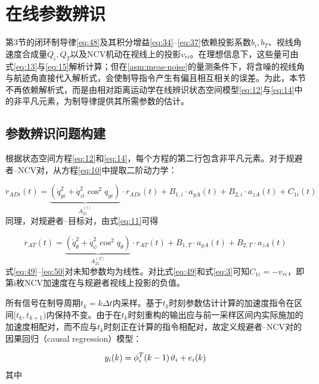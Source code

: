 \section{在线参数辨识}
第3节的闭环制导律\eqref{eq:48}及其积分增益\eqref{eq:34}--\eqref{eq:37}依赖投影系数${b_i},{b_T}$、视线角速度合成量${\dot Q_i},{\dot Q_T}$以及NCV机动在视线上的投影${v_{ri}}$。在理想信息下，这些量可由式\eqref{eq:13}与\eqref{eq:15}解析计算；但在\cref{asm:meas-noise}的量测条件下，将含噪的视线角与航迹角直接代入解析式，会使制导指令产生有偏且相互相关的误差。为此，本节不再依赖解析式，而是由相对距离运动学在线辨识状态空间模型\eqref{eq:12}与\eqref{eq:14}中的非平凡元素，为制导律提供其所需参数的估计。

\subsection{参数辨识问题构建}
根据状态空间方程\eqref{eq:12}和\eqref{eq:14}，每个方程的第二行包含非平凡元素。对于规避者–NCV对，从方程\eqref{eq:10}中提取二阶动力学：

\begin{equation}
\label{eq:49}
{\ddot r_{ADi}}(t) = \underbrace {(\dot q_{yi}^2 + \dot q_{zi}^2{{\cos }^2}{q_{yi}})}_{A_{21}^{(i)}} \cdot {r_{ADi}}(t) + {B_{1,i}} \cdot {a_{yA}}(t) + {B_{2,i}} \cdot {a_{zA}}(t) + {C_{1i}}(t)
\end{equation}
同理，对规避者–目标对，由式\eqref{eq:11}可得

\begin{equation}
\label{eq:50}
{\ddot r_{AT}}(t) = \underbrace {(\dot q_\theta ^2 + \dot q_\psi ^2{{\cos }^2}{q_\theta })}_{A_{21}^{(T)}} \cdot {r_{AT}}(t) + {B_{1,T}} \cdot {a_{yA}}(t) + {B_{2,T}} \cdot {a_{zA}}(t)
\end{equation}
式\eqref{eq:49}–\eqref{eq:50}对未知参数均为线性。对比式\eqref{eq:49}和式\eqref{eq:3}可知${C_{1i}} =  - {v_{ri}}$，即第i枚NCV加速度在与规避者视线上投影的负值。

所有信号在制导周期${t_k} = k\Delta t$内采样。基于${t_k}$时刻参数估计计算的加速度指令在区间$[{t_k},{t_{k + 1}})$内保持不变。由于在${t_k}$时刻重构的输出应与前一采样区间内实际施加的加速度相配对，而不应与${t_k}$时刻正在计算的指令相配对，故定义规避者–NCV对的因果回归（causal regression）模型：

\begin{equation}
\label{eq:51}
{y_i}(k) = \phi _i^T(k - 1){\kern 1pt} {\vartheta _i} + {e_i}(k)
\end{equation}
其中

